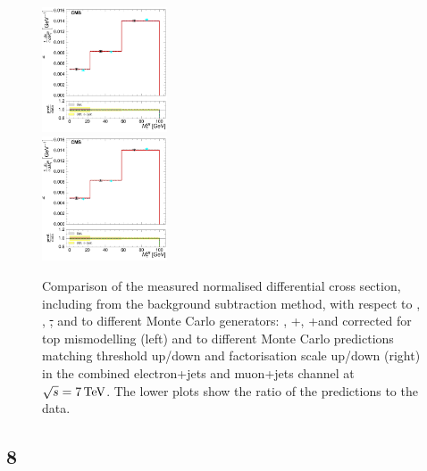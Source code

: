 \begin{figure}[hbtp]
     \includegraphics[width=0.33\textwidth]{Chapters/04_Analysis/04b_XSections/images/results/fit/7TeV/MT/central/normalised_xsection_combined_different_generators_with_bkgd_subtraction_results.pdf}\\
     \includegraphics[width=0.33\textwidth]{Chapters/04_Analysis/04b_XSections/images/results/fit/7TeV/MT/central/normalised_xsection_combined_systematics_shifts_with_bkgd_subtraction_results.pdf}\\
     \caption[Comparison of the measured normalised differential cross section, with background
     subtraction resutls, with respect to \met, \HT, \st, \wpt and \mt to different Monte Carlo generators and
     predictions at $\roots=7\TeV$.]{Comparison of the measured normalised differential cross section,
     including from the background subtraction method, with respect to \met, \HT, \st, \wpt and \mt to
     different Monte Carlo generators: \MADGRAPH, \POWHEG+\HERWIG, \POWHEG+\PYTHIA and \MADGRAPH corrected for
     top \pt mismodelling (left) and to different Monte Carlo predictions matching threshold up/down and
     factorisation scale up/down (right) in the combined electron+jets and muon+jets channel at
     $\roots=7\TeV$. The lower plots show the ratio of the predictions to the data.}
     \label{fig:result_with_background_subtraction_7TeV_combined}
\end{figure}

\FloatBarrier

\subsection{8~\TeV}
\label{as:8TeV_results_tables}






